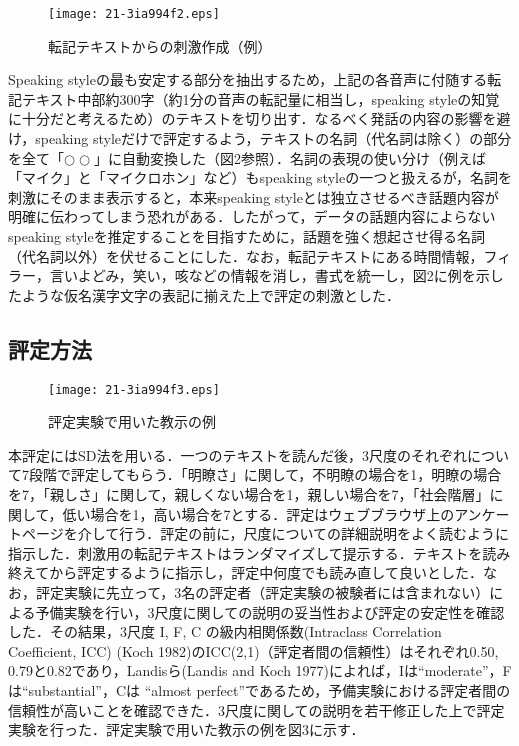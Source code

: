 \documentclass[japanese]{jnlp_1.4}
\begin{document}
\begin{figure}[b]
\begin{center}
\texttt{[image: 21-3ia994f2.eps]}
\end{center}
\caption{転記テキストからの刺激作成（例）}
\end{figure}

Speaking styleの最も安定する部分を抽出するため，上記の各音声に付随する転記テキスト中部約300字（約1分の音声の転記量に相当し，speaking styleの知覚に十分だと考えるため）のテキストを切り出す．なるべく発話の内容の影響を避け，speaking styleだけで評定するよう，テキストの名詞（代名詞は除く）の部分を全て「$\bigcirc \bigcirc $」に自動変換した（図2参照）．名詞の表現の使い分け（例えば「マイク」と「マイクロホン」など）もspeaking styleの一つと扱えるが，名詞を刺激にそのまま表示すると，本来speaking styleとは独立させるべき話題内容が明確に伝わってしまう恐れがある．したがって，データの話題内容によらないspeaking styleを推定することを目指すために，話題を強く想起させ得る名詞（代名詞以外）を伏せることにした．なお，転記テキストにある時間情報，フィラー，言いよどみ，笑い，咳などの情報を消し，書式を統一し，図2に例を示したような仮名漢字文字の表記に揃えた上で評定の刺激とした．


\subsection{評定方法}

\begin{figure}[b]
\begin{center}
\texttt{[image: 21-3ia994f3.eps]}
\end{center}
\caption{評定実験で用いた教示の例}
\end{figure}

本評定にはSD法を用いる．一つのテキストを読んだ後，3尺度のそれぞれについて7段階で評定してもらう．「明瞭さ」に関して，不明瞭の場合を1，明瞭の場合を7，「親しさ」に関して，親しくない場合を1，親しい場合を7，「社会階層」に関して，低い場合を1，高い場合を7とする．評定はウェブブラウザ上のアンケートページを介して行う．評定の前に，尺度についての詳細説明をよく読むように指示した．刺激用の転記テキストはランダマイズして提示する．テキストを読み終えてから評定するように指示し，評定中何度でも読み直して良いとした．なお，評定実験に先立って，3名の評定者（評定実験の被験者には含まれない）による予備実験を行い，3尺度に関しての説明の妥当性および評定の安定性を確認した．その結果，3尺度 I, F, C の級内相関係数(Intraclass Correlation Coefficient, ICC) (Koch 1982)のICC(2,1)（評定者間の信頼性）はそれぞれ0.50, 0.79と0.82であり，Landisら(Landis and Koch 1977)によれば，Iは``moderate''，Fは``substantial''，Cは ``almost perfect''であるため，予備実験における評定者間の信頼性が高いことを確認できた．3尺度に関しての説明を若干修正した上で評定実験を行った．評定実験で用いた教示の例を図3に示す．
\end{document}
